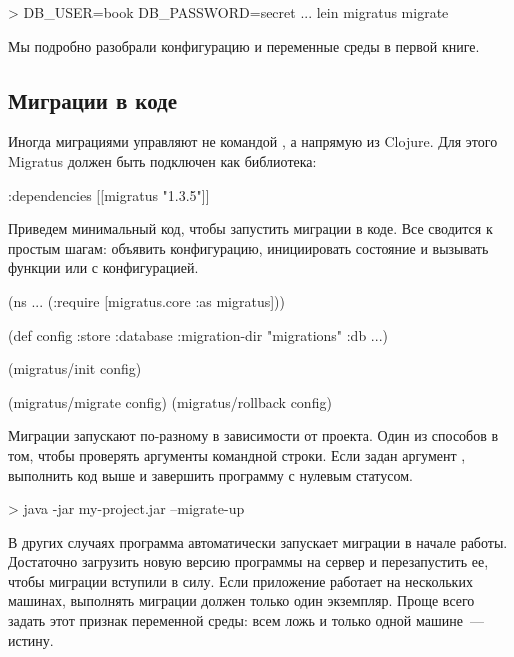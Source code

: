 \begin{english}
  \begin{bash}
> DB_USER=book DB_PASSWORD=secret ... lein migratus migrate
  \end{bash}
\end{english}

Мы подробно разобрали конфигурацию и переменные среды в первой книге.

\subsection{Миграции в коде}

Иногда миграциями управляют не командой , а напрямую из Clojure. Для этого Migratus должен быть подключен как библиотека:

\begin{english}
  \begin{clojure}
{:dependencies [[migratus "1.3.5"]]}
  \end{clojure}
\end{english}

Приведем минимальный код, чтобы запустить миграции в коде. Все сводится к простым шагам: объявить конфигурацию, инициировать состояние и вызывать функции  или  с конфигурацией.

\begin{english}
  \begin{clojure}
(ns ...
  (:require
   [migratus.core :as migratus]))

(def config
  {:store :database
   :migration-dir "migrations"
   :db {...}})

(migratus/init config)

(migratus/migrate config)
(migratus/rollback config)
  \end{clojure}
\end{english}

Миграции запускают по-разному в зависимости от проекта. Один из способов в том, чтобы проверять аргументы командной строки. Если задан аргумент , выполнить код выше и завершить программу с нулевым статусом.

\begin{english}
  \begin{bash}
> java -jar my-project.jar --migrate-up
  \end{bash}
\end{english}

В других случаях программа автоматически запускает миграции в начале работы. Достаточно загрузить новую версию программы на сервер и перезапустить ее, чтобы миграции вступили в силу. Если приложение работает на нескольких машинах, выполнять миграции должен только один экземпляр. Проще всего задать этот признак переменной среды: всем ложь и только одной машине~--- истину.

